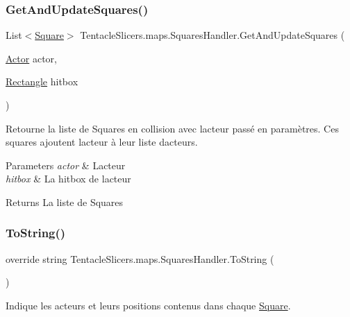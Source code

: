 \subsubsection{\texorpdfstring{Get\+And\+Update\+Squares()}{GetAndUpdateSquares()}}
{\footnotesize\ttfamily List$<$\hyperlink{class_tentacle_slicers_1_1maps_1_1_square}{Square}$>$ Tentacle\+Slicers.\+maps.\+Squares\+Handler.\+Get\+And\+Update\+Squares (\begin{DoxyParamCaption}\item[{\hyperlink{class_tentacle_slicers_1_1actors_1_1_actor}{Actor}}]{actor,  }\item[{\hyperlink{class_tentacle_slicers_1_1collisions_1_1_rectangle}{Rectangle}}]{hitbox }\end{DoxyParamCaption})}



Retourne la liste de Squares en collision avec l\textquotesingle{}acteur passé en paramètres. Ces squares ajoutent l\textquotesingle{}acteur à leur liste d\textquotesingle{}acteurs. 


\begin{DoxyParams}{Parameters}
{\em actor} & L\textquotesingle{}acteur \\
\hline
{\em hitbox} & La hitbox de l\textquotesingle{}acteur \\
\hline
\end{DoxyParams}
\begin{DoxyReturn}{Returns}
La liste de Squares 
\end{DoxyReturn}
\mbox{\label{class_tentacle_slicers_1_1maps_1_1_squares_handler_afb49d452ddd0e4ff5b5bbc19e90b870c}} 
\subsubsection{\texorpdfstring{To\+String()}{ToString()}}
{\footnotesize\ttfamily override string Tentacle\+Slicers.\+maps.\+Squares\+Handler.\+To\+String (\begin{DoxyParamCaption}{ }\end{DoxyParamCaption})}



Indique les acteurs et leurs positions contenus dans chaque \hyperlink{class_tentacle_slicers_1_1maps_1_1_square}{Square}. 

